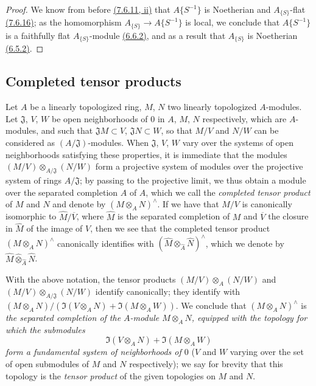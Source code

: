 \begin{proof}
\label{proof-0.7.6.18}
We know from before \hyperref[0.7.6.11]{(7.6.11, ii)} that $A\{S^{-1}\}$ is Noetherian and
$A_{\{S\}}$-flat \hyperref[0.7.6.16]{(7.6.16)}; as the homomorphism $A_{\{S\}}\to A\{S^{-1}\}$
is local, we conclude that $A\{S^{-1}\}$ is a faithfully flat $A_{\{S\}}$-module
\hyperref[0.6.6.2]{(6.6.2)}, and as a result that $A_{\{S\}}$ is Noetherian
\hyperref[0.6.5.2]{(6.5.2)}.
\end{proof}

\subsection{Completed tensor products}
\label{subsection-completed-tensor-prods}

\begin{env}[7.7.1]
\label{0.7.1.1}
Let $A$ be a linearly topologized ring, $M$, $N$ two linearly topologized $A$-modules. Let
$\mathfrak{J}$, $V$, $W$ be open neighborhoods of $0$ in $A$, $M$, $N$ respectively, which are
$A$-modules, and such that $\mathfrak{J}M\subset V$, $\mathfrak{J}N\subset W$, so that
$M/V$ and $N/W$ can be considered as $(A/\mathfrak{J})$-modules. When $\mathfrak{J}$, $V$, $W$
vary over the systems of open neighborhoods satisfying these properties, it is immediate that the
modules $(M/V)\otimes_{A/\mathfrak{J}}(N/W)$ form a projective system of modules
over the projective system of rings $A/\mathfrak{J}$; by passing to the projective limit, we
thus obtain a module over the separated completion $\widehat{A}$ of $A$, which we call the
{\em completed tensor product} of $M$ and $N$ and denote by $(M\otimes_A N)^\wedge$. If we have
that $M/V$ is canonically isomorphic to $\widehat{M}/\overline{V}$, where $\widehat{M}$ is the
separated completion of $M$ and $\overline{V}$ the closure in $\widehat{M}$ of the image of $V$,
then we see that the completed tensor product $(M\otimes_A N)^\wedge$ canonically identifies with
$(\widehat{M}\otimes_{\widehat{A}}\widehat{N})^\wedge$, which we denote by
$\widehat{M}\widehat{\otimes}_{\widehat{A}}\widehat{N}$.
\end{env}

\begin{env}[7.7.2]
\label{0.7.7.2}
With the above notation, the tensor products $(M/V)\otimes_A(N/W)$ and
$(M/V)\otimes_{A/\mathfrak{J}}(N/W)$ identify canonically; they identify with
$(M\otimes_A N)/(\Im(V\otimes_A N)+\Im(M\otimes_A W))$. We conclude that $(M\otimes_A N)^\wedge$
is {\em the separated completion of the $A$-module $M\otimes_A N$, equipped with the topology for
which the submodules
\[
  \Im(V\otimes_A N)+\Im(M\otimes_A W)
\]
form a fundamental system of neighborhoods of $0$} ($V$ and $W$ varying over the set of open submodules
of $M$ and $N$ respectively); we say for brevity that this topology is the {\em tensor product} of
the given topologies on $M$ and $N$.
\end{env}


